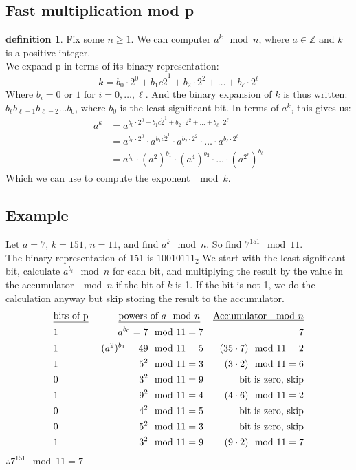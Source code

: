\documentclass[10pt]{article}
\newcommand{\Z}{\mathbb{Z}}
\theoremstyle{definition}
\newtheorem{definition}[theorem]{definition}
\theoremstyle{remark}
\def\Z{\mathbb{ Z}}
\begin{document}
\subsection{Fast multiplication mod p}
\begin{definition}
Fix some $n \geq 1$.  We can computer $a^k \mod n$, where $a \in \Z$ and $k$ is a positive integer.\\
We expand p in terms of its binary representation:
$$ k = b_0 \cdot 2^0 + b_1 c\dot 2^1 + b_2 \cdot 2^2 + \ldots + b_{\ell} \cdot 2^{\ell} $$
Where $b_i = 0 \text{ or } 1 \text{ for } i = 0,\ldots,\ell$.  And the binary expansion of $k$ is thus written: $b_{\ell}b_{\ell-1}b_{\ell-2} \ldots b_{0}$, where $b_0$ is the least significant bit.  In terms of $a^k$, this gives us:
\begin{align*}
a^k &= a^{b_0 \cdot 2^0 + b_1 c\dot 2^1 + b_2 \cdot 2^2 + \ldots + b_{\ell} \cdot 2^{\ell}} \\
&= a^{b_0 \cdot 2^0} \cdot a^{b_1 c\dot 2^1} \cdot a^{b_2 \cdot 2^2} \cdot \ldots \cdot a^{b_{\ell} \cdot 2^{\ell}} \\
&= a^{b_0} \cdot (a^2)^{b_1} \cdot (a^4)^{b_2} \cdot \ldots \cdot (a^{2^{\ell}})^{b_{\ell}}
\end{align*}
Which we can use to compute the exponent $\mod k$.
\end{definition}
\subsection{Example}
Let $a=7$, $k=151$, $n=11$, and find $a^k \mod n$.  So find $7^151 \mod 11$.\\
The binary representation of 151 is $10010111_2$
We start with the least significant bit, calculate $a^{b_i} \mod n$ for each bit, and multiplying the result by the value in the accumulator $\mod n$ if the bit of $k$ is 1.  If the bit is not 1, we do the calculation anyway but skip storing the result to the accumulator.
\begin{align*}
&\text{\underline{bits of p}  }&\text{ \underline{powers of $a \mod n$} } && \text{\underline{Accumulator $\mod n$}}\\
&1 & a^{b_0} = 7 \mod 11 = 7 && 7\\
&1 & (a^2)^{b_1} = 49 \mod 11 = 5 && (35 \cdot 7) \mod 11 = 2\\
&1 & 5^2 \mod 11 = 3 && (3 \cdot 2) \mod 11 = 6 \\
&0 & 3^2 \mod 11 = 9 && \text{bit is zero, skip}\\
&1 & 9^2 \mod 11 = 4 && (4 \cdot 6) \mod 11 = 2\\
&0 & 4^2 \mod 11 = 5 && \text{bit is zero, skip}\\
&0 & 5^2 \mod 11 = 3 && \text{bit is zero, skip}\\
&1 & 3^2 \mod 11 = 9 && (9 \cdot 2) \mod 11 = 7\\
\end{align*}
$\therefore 7^151 \mod 11 = 7$
\end{document}
